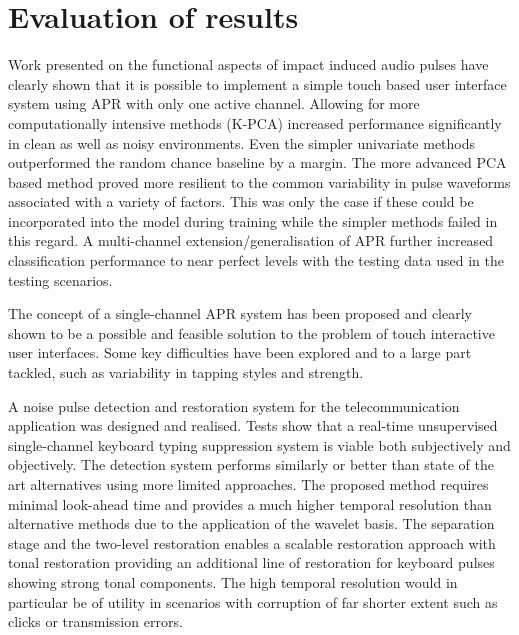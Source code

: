 \section{Evaluation of results}
Work presented on the functional aspects of impact induced audio pulses have clearly shown that it is possible to implement a simple touch based user interface system using APR with only one active channel. Allowing for more computationally intensive methods (K-PCA) increased performance significantly in clean as well as noisy environments. Even the simpler univariate methods outperformed the random chance baseline by a margin. The more advanced PCA based method proved more resilient to the common variability in pulse waveforms associated with a variety of factors. This was only the case if these could be incorporated into the model during training while the simpler methods failed in this regard. A multi-channel extension/generalisation of APR further increased classification performance to near perfect levels with the testing data used in the testing scenarios.

The concept of a single-channel APR system has been proposed and clearly shown to be a possible and feasible solution to the problem of touch interactive user interfaces. Some key difficulties have been explored and to a large part tackled, such as variability in tapping styles and strength.

A noise pulse detection and restoration system for the telecommunication application was designed and realised. Tests show that a real-time unsupervised single-channel keyboard typing suppression system is viable both subjectively and objectively. The detection system performs similarly or better than state of the art alternatives using more limited approaches. The proposed method requires minimal look-ahead time and provides a much higher temporal resolution than alternative methods due to the application of the wavelet basis. The separation stage and the two-level restoration enables a scalable restoration approach with tonal restoration providing an additional line of restoration for keyboard pulses showing strong tonal components. The high temporal resolution would in particular be of utility in scenarios with corruption of far shorter extent such as clicks or transmission errors.

